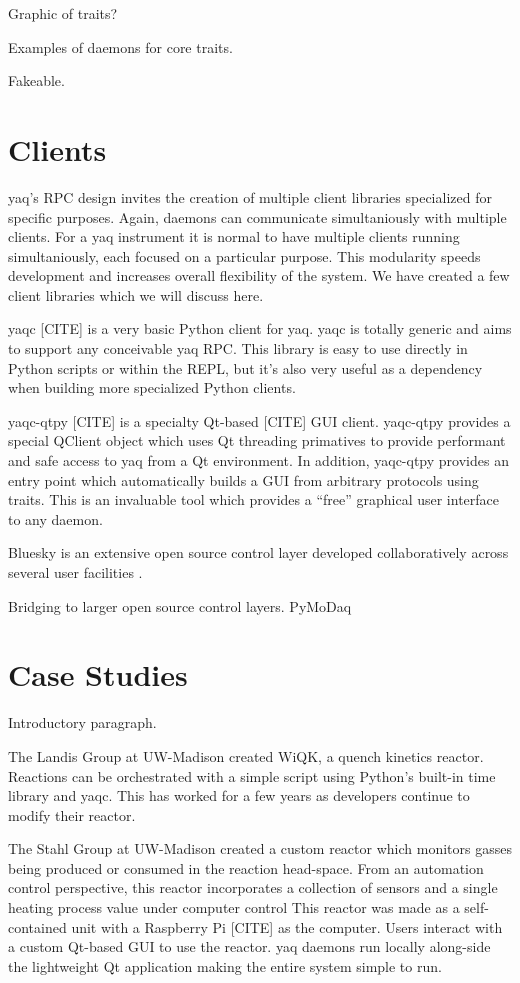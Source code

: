\documentclass{article}
\begin{document}
Graphic of traits?

Examples of daemons for core traits.

Fakeable.

\section{Clients}

yaq's RPC design invites the creation of multiple client libraries specialized for specific purposes.
Again, daemons can communicate simultaniously with multiple clients.
For a yaq instrument it is normal to have multiple clients running simultaniously, each focused on a particular purpose.
This modularity speeds development and increases overall flexibility of the system.
We have created a few client libraries which we will discuss here.

yaqc [CITE] is a very basic Python client for yaq.
yaqc is totally generic and aims to support any conceivable yaq RPC.
This library is easy to use directly in Python scripts or within the REPL, but it's also very useful as a dependency when building more specialized Python clients.

yaqc-qtpy [CITE] is a specialty Qt-based [CITE] GUI client.
yaqc-qtpy provides a special QClient object which uses Qt threading primatives to provide performant and safe access to yaq from a Qt environment.
In addition, yaqc-qtpy provides an entry point which automatically builds a GUI from arbitrary protocols using traits.
This is an invaluable tool which provides a ``free'' graphical user interface to any daemon.

Bluesky is an extensive open source control layer developed collaboratively across several user facilities \cite{AllanDanielB2019a}.

Bridging to larger open source control layers.
PyMoDaq \cite{WeberSebastien2021a}

\section{Case Studies}

Introductory paragraph.

The Landis Group at UW-Madison created WiQK, a quench kinetics reactor.
Reactions can be orchestrated with a simple script using Python's built-in time library and yaqc.
This has worked for a few years as developers continue to modify their reactor.

The Stahl Group at UW-Madison created a custom reactor which monitors gasses being produced or consumed in the reaction head-space.  \cite{SalazarChaseA2021a}
From an automation control perspective, this reactor incorporates a collection of sensors and a single heating process value under computer control
This reactor was made as a self-contained unit with a Raspberry Pi [CITE] as the computer.
Users interact with a custom Qt-based GUI to use the reactor.
yaq daemons run locally along-side the lightweight Qt application making the entire system simple to run.
\end{document}
